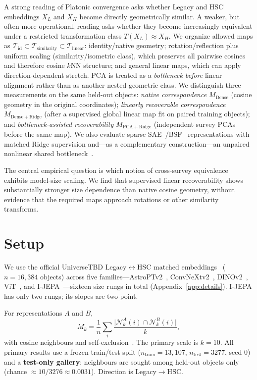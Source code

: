 \documentclass{article}
\begin{document}
A strong reading of Platonic convergence asks whether Legacy and HSC embeddings \(X_L\) and \(X_H\) become directly geometrically similar.
A weaker, but often more operational, reading asks whether they become increasingly equivalent under a restricted transformation class \(T(X_L)\approx X_H\).
We organize allowed maps as
\(\mathcal T_{\mathrm{id}}\subset\mathcal T_{\mathrm{similarity}}\subset\mathcal T_{\mathrm{linear}}\):
identity/native geometry; rotation/reflection plus uniform scaling (similarity/isometric class), which preserves all pairwise cosines and therefore cosine \(k\)NN structure; and general linear maps, which can apply direction-dependent stretch.
PCA is treated as a \emph{bottleneck before} linear alignment rather than as another nested geometric class.
We distinguish three measurements on the same held-out objects:
\emph{native correspondence} \(M_{\mathrm{Dense}}\) (cosine geometry in the original coordinates);
\emph{linearly recoverable correspondence} \(M_{\mathrm{Dense+Ridge}}\) (after a supervised global linear map fit on paired training objects);
and \emph{bottleneck-assisted recoverability} \(M_{\mathrm{PCA+Ridge}}\) (independent survey PCAs before the same map).
We also evaluate sparse SAE~\citep{gao2025sae}/BSF~\citep{fel2026bsf} representations with matched Ridge supervision and---as a complementary construction---an unpaired nonlinear shared bottleneck~\citep{jha2025vec2vec}.

The central empirical question is which notion of cross-survey equivalence exhibits model-size scaling.
We find that supervised linear recoverability shows substantially stronger size dependence than native cosine geometry, without evidence that the required maps approach rotations or other similarity transforms.

\section{Setup}
\label{sec:setup}

We use the official UniverseTBD Legacy\(\leftrightarrow\)HSC matched embeddings~\citep{duraphe2025platonicuniverse} (\(n{=}16{,}384\) objects) across five families---AstroPTv2~\citep{smith2024astropt}, ConvNeXtv2~\citep{woo2023convnextv2}, DINOv2~\citep{oquab2024dinov2}, ViT~\citep{dosovitskiy2021vit}, and I-JEPA~\citep{assran2023ijepa}---sixteen size rungs in total (Appendix~\ref{app:details}).
I-JEPA has only two rungs; its slopes are two-point.

For representations \(A\) and \(B\),
\[
M_k=\frac{1}{n}\sum_i
\frac{\lvert \mathcal N_k^A(i)\cap \mathcal N_k^B(i)\rvert}{k},
\]
with cosine neighbours and self-exclusion~\citep{huh2024platonic,duraphe2025platonicuniverse}.
The primary scale is \(k{=}10\).
All primary results use a frozen train/test split (\(n_{\mathrm{train}}{=}13{,}107\), \(n_{\mathrm{test}}{=}3277\), seed \(0\)) and a \textbf{test-only gallery}: neighbours are sought among held-out objects only (chance \(\approx 10/3276\approx0.0031\)).
Direction is Legacy\(\to\)HSC.
\end{document}
